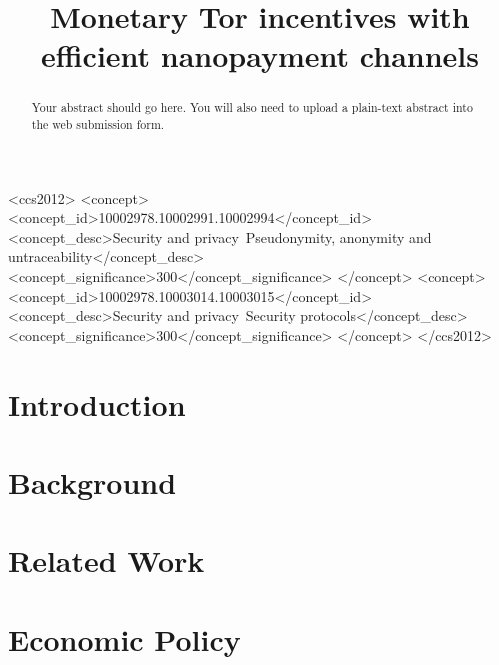 \documentclass[sigconf, anonymous]{acmart}
\begin{document}
\title{Monetary Tor incentives with efficient nanopayment channels} %

\begin{abstract}
Your abstract should go here. You will also need to upload a plain-text abstract into the web submission form.
\end{abstract}

\begin{CCSXML}
<ccs2012>
<concept>
<concept_id>10002978.10002991.10002994</concept_id>
<concept_desc>Security and privacy~Pseudonymity, anonymity and untraceability</concept_desc>
<concept_significance>300</concept_significance>
</concept>
<concept>
<concept_id>10002978.10003014.10003015</concept_id>
<concept_desc>Security and privacy~Security protocols</concept_desc>
<concept_significance>300</concept_significance>
</concept>
</ccs2012>
\end{CCSXML}



\maketitle

\section{Introduction}
\label{sec:introduction}


\section{Background}
\label{sec:background}


\section{Related Work}
\label{sec:related_work}


\section{Economic Policy}
\label{sec:tor_incentives}

\end{document}
